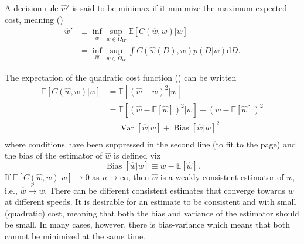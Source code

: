 \begin{definition}
	\label{def:minimax}
	A decision rule $\hat{w}'$ is said to be minimax if it minimize the maximum expected cost, meaning ()
	\begin{equation}
		\begin{split}
			\hat{w}' &\equiv \inf_{\hat{w}}\sup_{w\in \Omega_W}\mathbb{E}[C(\hat{w},w)|w]\\
			& = \inf_{\hat{w}}\sup_{w\in \Omega_W}\int  C(\hat{w}(D),w) p(D|w) \mathrm{d}D.
		\end{split}
	\end{equation}
\end{definition}


\begin{theorem}
	\label{theorem:MSE}
	The expectation of the quadratic cost function () can be written
	\begin{equation}
		\begin{split}
			\mathbb{E}[C(\hat{w}, w)|w] &= \mathbb{E}[(\hat{w}-w)^2|w]\\ 
			&= \mathbb{E}[(\hat{w}-\mathbb{E}[\hat{w}])^2|w]+(w-\mathbb{E}[\hat{w}])^2\\
			&=\operatorname{Var}[\hat{w}|w]+\operatorname{Bias}[\hat{w}|w]^2\\
		\end{split}
		\label{eq:MSE}
	\end{equation}
	where conditions have been suppressed in the second line (to fit to the page) and the bias of the estimator of $\hat{w}$ is defined viz
	\begin{equation}
		\operatorname{Bias}[\hat{w}|w]\equiv w-\mathbb{E}[\hat{w}].
	\end{equation}
	If $\mathbb{E}[C(\hat{w}, w)|w] \to 0$ as $n \to \infty$, then $\hat{w}$ is a weakly consistent estimator of $w$, i.e., $\hat{w} \xrightarrow{p} w$. There can be different consistent estimates that converge towards $w$ at different speeds. It is desirable for an estimate to be consistent and with small (quadratic) cost, meaning that both the bias and variance of the estimator should be small. In many cases, however, there is bias-variance which means that both cannot be minimized at the same time. 
\end{theorem}

